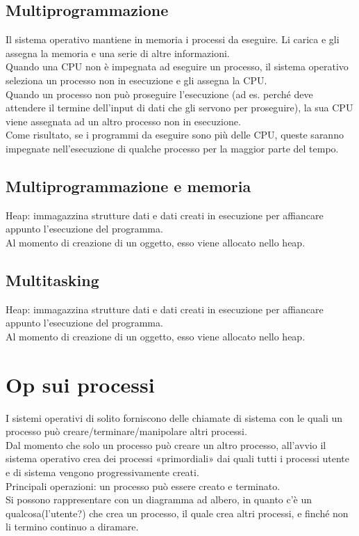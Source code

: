 \subsection{Multiprogrammazione}
Il sistema operativo mantiene in memoria i processi da eseguire. Li carica e gli assegna la memoria e una serie di altre informazioni.
\\Quando una CPU non è impegnata ad eseguire un processo, il sistema operativo seleziona un processo non in esecuzione e gli assegna la CPU.
\\Quando un processo non può proseguire l'esecuzione (ad es. perché deve attendere il termine dell'input di dati che gli servono per proseguire), la sua CPU viene assegnata ad un altro processo non in esecuzione.
\\Come risultato, se i programmi da eseguire sono più delle CPU, queste saranno impegnate nell'esecuzione di qualche processo per la maggior parte del tempo.

\subsection{Multiprogrammazione e memoria}
Heap: immagazzina strutture dati e dati creati in esecuzione per affiancare appunto l'esecuzione del programma.
\\Al momento di creazione di un oggetto, esso viene allocato nello heap.

\subsection{Multitasking}
Heap: immagazzina strutture dati e dati creati in esecuzione per affiancare appunto l'esecuzione del programma.
\\Al momento di creazione di un oggetto, esso viene allocato nello heap.

\section{Op sui processi}
I sistemi operativi di solito forniscono delle chiamate di sistema con le quali un processo può creare/terminare/manipolare altri processi.
\\Dal momento che solo un processo può creare un altro processo, all'avvio il sistema operativo crea dei processi «primordiali» dai quali tutti i processi utente e di sistema vengono progressivamente creati.
\\Principali operazioni: un processo può essere creato e terminato.
\\Si possono rappresentare con un diagramma ad albero, in quanto c'è un qualcosa(l'utente?) che crea un processo, il quale crea altri processi, e finché non li termino continuo a diramare.

